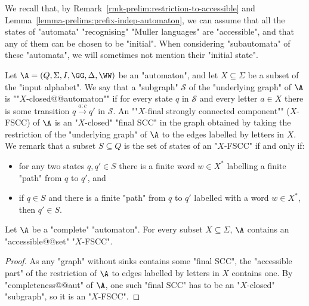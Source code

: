 \documentclass[10pt,a4paper]{amsart}
\renewcommand{\S}{\mathcal{S}}
\renewcommand{\SS}{\Sigma}
\newcommand{\re}[1]{\xrightarrow{#1}}
\begin{document}
We recall that, by Remark~\ref{rmk-prelim:restriction-to-accessible} and Lemma~\ref{lemma-prelims:prefix-indep-automaton}, we can assume that all the states of "automata" "recognising" "Muller languages" are "accessible", and that any of them can be chosen to be "initial". When considering "subautomata" of these "automata", we will sometimes not mention their "initial state".

Let $\A = (Q, \SS, I, \GG, \Delta, \WW)$ be an "automaton", and let $X\subseteq \SS$ be a subset of the "input alphabet". 
\AP We say that a "subgraph" $\S$ of the "underlying graph" of $\A$ is ""$X$-closed@@automaton"" if for every state $q$ in $\S$ and every letter $a\in X$ there is some transition $q\re{a:c}q'$ in $\S$.
\AP An ""$X$-final strongly connected component"" ($X$-FSCC) of $\A$ is an "$X$-closed" "final SCC" in the graph obtained by taking the restriction of the "underlying graph" of $\A$ to the edges labelled by letters in $X$. We remark that a subset $S\subseteq Q$ is the set of states of an "$X$-FSCC" if and only if:
\begin{itemize}
	\item for any two states $q, q'\in S$ there is a finite word $w\in X^*$ labelling a finite "path" from $q$ to $q'$, and
	\item if $q\in S$ and there is a finite "path" from $q$ to $q'$ labelled with a word $w\in X^*$, then $q'\in S$.
\end{itemize}



\begin{lemma}\label{lemma-ZT:existance-X-FSCC}
	Let $\A$ be a "complete" "automaton". For every subset $X\subseteq \SS$, $\A$ contains an "accessible@@set" "$X$-FSCC".
\end{lemma}
\begin{proof}
	As any "graph" without sinks contains some "final SCC", the "accessible part" of the restriction of $\A$ to edges labelled by letters in $X$ contains one. By "completeness@@aut" of $\A$, one such "final SCC" has to be an "$X$-closed" "subgraph", so it is an "$X$-FSCC".
\end{proof}
\end{document}
